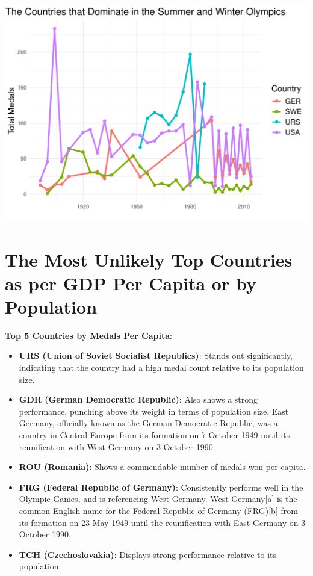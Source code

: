 \documentclass[12pt,preprint, authoryear]{elsarticle}
\let\origfigure\figure
\let\endorigfigure\endfigure
\renewenvironment{figure}[1][2] {
    \expandafter\origfigure\expandafter[H]
} {
    \endorigfigure
}
\numberwithin{equation}{section}
\numberwithin{figure}{section}
\numberwithin{table}{section}
\begin{document}
\begin{figure}

{\centering \includegraphics{README_files/figure-latex/unnamed-chunk-1-1} 

}

\caption{The Top Countries that Dominate in both the Summer and Winter Olympics\label{Figure1}}\label{fig:unnamed-chunk-1}
\end{figure}

\hypertarget{the-most-unlikely-top-countries-as-per-gdp-per-capita-or-by-population}{%
\section{The Most Unlikely Top Countries as per GDP Per Capita or by
Population}\label{the-most-unlikely-top-countries-as-per-gdp-per-capita-or-by-population}}

\textbf{Top 5 Countries by Medals Per Capita}:

\begin{itemize}
\item
  \textbf{URS (Union of Soviet Socialist Republics)}: Stands out
  significantly, indicating that the country had a high medal count
  relative to its population size.
\item
  \textbf{GDR (German Democratic Republic)}: Also shows a strong
  performance, punching above its weight in terms of population size.
  East Germany, officially known as the German Democratic Republic, was
  a country in Central Europe from its formation on 7 October 1949 until
  its reunification with West Germany on 3 October 1990.
\item
  \textbf{ROU (Romania)}: Shows a commendable number of medals won per
  capita.
\item
  \textbf{FRG (Federal Republic of Germany)}: Consistently performs well
  in the Olympic Games, and is referencing West Germany. West
  Germany{[}a{]} is the common English name for the Federal Republic of
  Germany (FRG){[}b{]} from its formation on 23 May 1949 until the
  reunification with East Germany on 3 October 1990.
\item
  \textbf{TCH (Czechoslovakia)}: Displays strong performance relative to
  its population.
\end{itemize}
\end{document}
